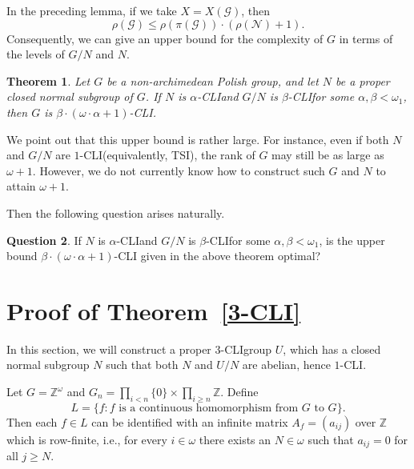 \documentclass[11pt]{amsart}
\newtheorem{theorem}{Theorem}[section]
\theoremstyle{definition}
\newtheorem{question}[theorem]{Question}
\theoremstyle{remark}
\numberwithin{equation}{section}
\def\Z {{\mathbb{Z}}}
\def\dgnb{{\mathrm{dgnb}}}
\def\hier#1{$#1$-CLI}
\begin{document}
In the preceding lemma, if we take $X=X(\mathcal{G})$, then
$$\rho(\mathcal{G})\leq\rho(\pi(\mathcal{G}))\cdot(\rho(\mathcal{N})+1).$$
Consequently, we can give an upper bound for the complexity of $G$ in terms of the levels of $G/N$ and $N$.
\begin{theorem}
    Let $G$ be a non-archimedean Polish group, and let $N$ be a proper closed normal subgroup of $G$. If $N$ is \hier\alpha\space and $G/N$ is \hier\beta\space for some $\alpha,\beta<\omega_1$, then $G$ is \hier{\beta\cdot(\omega\cdot\alpha+1)}.
\end{theorem}

We point out that this upper bound is rather large. For instance, even if both $N$ and $G/N$ are \hier1\space(equivalently, TSI), the rank of $G$ may still be as large as $\omega+1$. However, we do not currently know how to construct such $G$ and $N$ to attain $\omega+1$.

Then the following question arises naturally.

\begin{question}
If $N$ is \hier\alpha\space and $G/N$ is \hier\beta\space for some $\alpha,\beta<\omega_1$, is the upper bound \hier{\beta\cdot(\omega\cdot\alpha+1)} given in the above theorem optimal?
\end{question}


\section{Proof of Theorem~\ref{3-CLI}}

In this section, we will construct a proper \hier3\space group $U$, which has a closed normal subgroup $N$ such that both $N$ and $U/N$ are abelian, hence \hier1.

Let $G=\Z^\omega$ and $G_n=\prod_{i<n}\{0\}\times\prod_{i\geq n}\Z$. Define
$$L=\{f:f\mbox{ is a continuous homomorphism from $G$ to $G$}\}.$$
Then each $f\in L$ can be identified with an infinite matrix $A_f=(a_{ij})$ over $\Z$ which is row-finite, i.e., for every $i\in\omega$ there exists an $N\in\omega$ such that $a_{ij}=0$ for all $j\geq N$.
\end{document}
